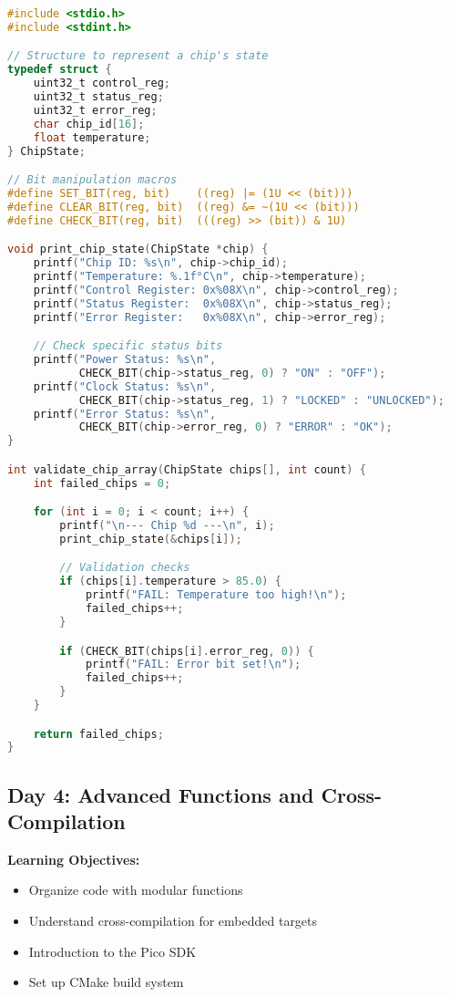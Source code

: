 \documentclass[11pt,a4paper]{article}
\begin{document}
\begin{lstlisting}[language=C, caption=Day 3 Example: Chip State Monitor]
#include <stdio.h>
#include <stdint.h>

// Structure to represent a chip's state
typedef struct {
    uint32_t control_reg;
    uint32_t status_reg;
    uint32_t error_reg;
    char chip_id[16];
    float temperature;
} ChipState;

// Bit manipulation macros
#define SET_BIT(reg, bit)    ((reg) |= (1U << (bit)))
#define CLEAR_BIT(reg, bit)  ((reg) &= ~(1U << (bit)))
#define CHECK_BIT(reg, bit)  (((reg) >> (bit)) & 1U)

void print_chip_state(ChipState *chip) {
    printf("Chip ID: %s\n", chip->chip_id);
    printf("Temperature: %.1f°C\n", chip->temperature);
    printf("Control Register: 0x%08X\n", chip->control_reg);
    printf("Status Register:  0x%08X\n", chip->status_reg);
    printf("Error Register:   0x%08X\n", chip->error_reg);

    // Check specific status bits
    printf("Power Status: %s\n",
           CHECK_BIT(chip->status_reg, 0) ? "ON" : "OFF");
    printf("Clock Status: %s\n",
           CHECK_BIT(chip->status_reg, 1) ? "LOCKED" : "UNLOCKED");
    printf("Error Status: %s\n",
           CHECK_BIT(chip->error_reg, 0) ? "ERROR" : "OK");
}

int validate_chip_array(ChipState chips[], int count) {
    int failed_chips = 0;

    for (int i = 0; i < count; i++) {
        printf("\n--- Chip %d ---\n", i);
        print_chip_state(&chips[i]);

        // Validation checks
        if (chips[i].temperature > 85.0) {
            printf("FAIL: Temperature too high!\n");
            failed_chips++;
        }

        if (CHECK_BIT(chips[i].error_reg, 0)) {
            printf("FAIL: Error bit set!\n");
            failed_chips++;
        }
    }

    return failed_chips;
}
\end{lstlisting}

\subsection{Day 4: Advanced Functions and Cross-Compilation}

\textbf{Learning Objectives:}
\begin{itemize}
    \item Organize code with modular functions
    \item Understand cross-compilation for embedded targets
    \item Introduction to the Pico SDK
    \item Set up CMake build system
\end{itemize}
\end{document}
